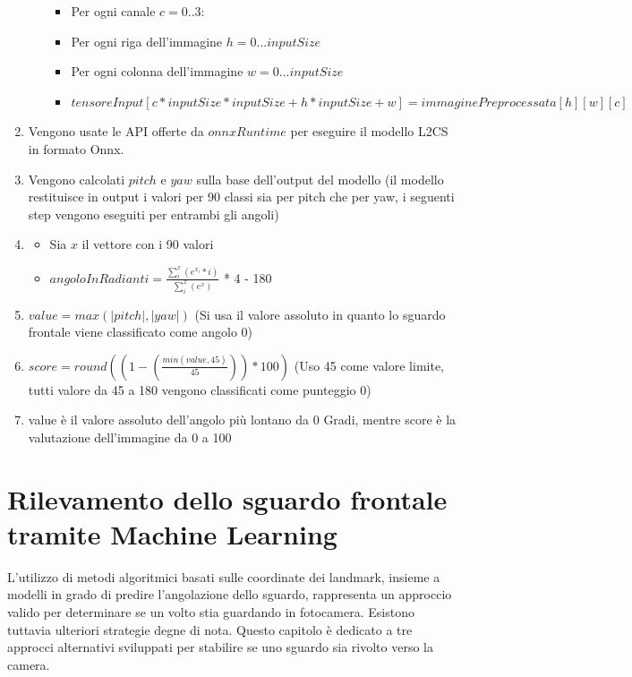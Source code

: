 \documentclass[12pt,a4paper,openright,twoside]{book}
\begin{document}
\begin{enumerate}
\begin{itemize}
\begin{itemize}
            \item Per ogni canale \(c = 0..3\): 
            \item Per ogni riga dell'immagine \(h = 0...inputSize\) 
            \item Per ogni colonna dell'immagine \(w = 0...inputSize\) 
            \item \(tensoreInput[c * inputSize * inputSize + h * inputSize + w] = immaginePreprocessata[h][w][c]\)
        \end{itemize}
    \end{itemize}
    \item Vengono usate le API offerte da \(onnxRuntime\) per eseguire il modello L2CS in formato Onnx. 
    \item Vengono calcolati \(pitch\) e \(yaw\) sulla base dell'output del modello (il modello restituisce in output i valori per 90 classi sia per pitch che per yaw, i seguenti step vengono eseguiti per entrambi gli angoli) 
    \item \begin{itemize} 
        \item Sia \(x\) il vettore con i 90 valori
        \item \(angoloInRadianti = \frac{\sum_{i}^{x} (e^{x_i}*i)}{\sum_i^{x}(e^x)}\) * 4 - 180
    \end{itemize}
    \item \( value = max(|pitch|, |yaw|) \) (Si usa il valore assoluto in quanto lo sguardo frontale viene classificato come angolo 0)
    \item \( score = round((1 - (\frac{min(value, 45)}{45}))*100) \) (Uso 45 come valore limite, tutti valore da 45 a 180 vengono classificati come punteggio 0)
    \item value è il valore assoluto dell'angolo più lontano da 0 Gradi, mentre score è la valutazione dell'immagine da 0 a 100
\end{enumerate}

\chapter{Rilevamento dello sguardo frontale tramite Machine Learning}
\label{chap:frontal_gaze_with_ml}

L'utilizzo di metodi algoritmici basati sulle coordinate dei landmark, insieme a modelli in grado di predire l'angolazione dello sguardo, rappresenta un approccio valido per determinare se un volto stia guardando in fotocamera. Esistono tuttavia ulteriori strategie degne di nota. Questo capitolo è dedicato a tre approcci alternativi sviluppati per stabilire se uno sguardo sia rivolto verso la camera.
\end{document}
